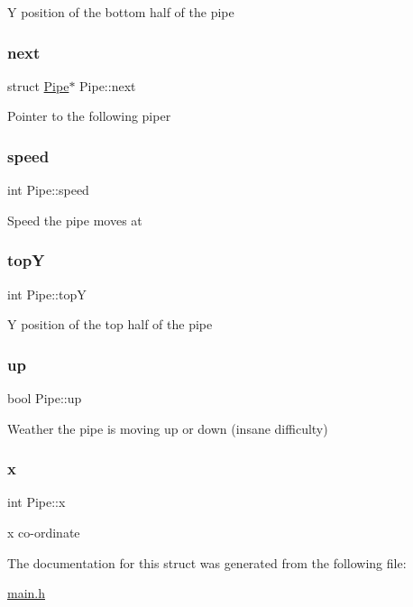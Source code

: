 Y position of the bottom half of the pipe \mbox{\label{struct_pipe_a98ef5d289100cfe967a4db2c83b8b7d1}} 
\subsubsection{\texorpdfstring{next}{next}}
{\footnotesize\ttfamily struct \hyperlink{struct_pipe}{Pipe}$\ast$ Pipe\+::next}

Pointer to the following piper \mbox{\label{struct_pipe_a94d42f9c582423433b7039466579a493}} 
\subsubsection{\texorpdfstring{speed}{speed}}
{\footnotesize\ttfamily int Pipe\+::speed}

Speed the pipe moves at \mbox{\label{struct_pipe_a33248541bebc39fb7e699a495ac2efee}} 
\subsubsection{\texorpdfstring{topY}{topY}}
{\footnotesize\ttfamily int Pipe\+::topY}

Y position of the top half of the pipe \mbox{\label{struct_pipe_a7e5ae0dd02b0eda1da8c877e7fefa997}} 
\subsubsection{\texorpdfstring{up}{up}}
{\footnotesize\ttfamily bool Pipe\+::up}

Weather the pipe is moving up or down (insane difficulty) \mbox{\label{struct_pipe_ad9a022a035c93f68117d6b671a57a68b}} 
\subsubsection{\texorpdfstring{x}{x}}
{\footnotesize\ttfamily int Pipe\+::x}

x co-\/ordinate 

The documentation for this struct was generated from the following file\+:\begin{DoxyCompactItemize}
\item 
\hyperlink{main_8h}{main.\+h}\end{DoxyCompactItemize}
